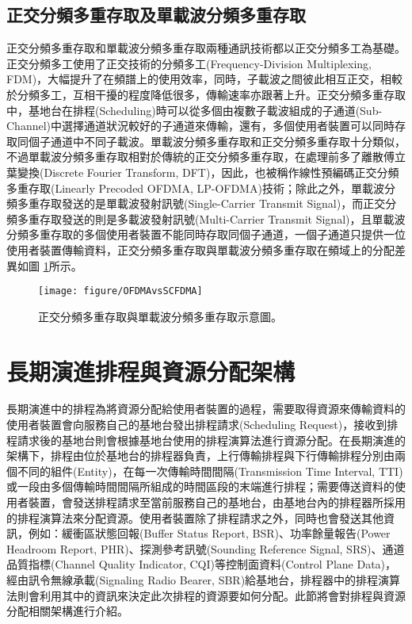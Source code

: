 \subsection{正交分頻多重存取及單載波分頻多重存取}
正交分頻多重存取和單載波分頻多重存取兩種通訊技術都以正交分頻多工為基礎。正交分頻多工使用了正交技術的分頻多工(Frequency-Division Multiplexing, FDM)，大幅提升了在頻譜上的使用效率，同時，子載波之間彼此相互正交，相較於分頻多工，互相干擾的程度降低很多，傳輸速率亦跟著上升。正交分頻多重存取中，基地台在排程(Scheduling)時可以從多個由複數子載波組成的子通道(Sub-Channel)中選擇通道狀況較好的子通道來傳輸，還有，多個使用者裝置可以同時存取同個子通道中不同子載波。單載波分頻多重存取和正交分頻多重存取十分類似，不過單載波分頻多重存取相對於傳統的正交分頻多重存取，在處理前多了離散傅立葉變換(Discrete Fourier Transform, DFT)，因此，也被稱作線性預編碼正交分頻多重存取(Linearly Precoded OFDMA, LP-OFDMA)技術\cite{damn2011}；除此之外，單載波分頻多重存取發送的是單載波發射訊號(Single-Carrier Transmit Signal)，而正交分頻多重存取發送的則是多載波發射訊號(Multi-Carrier Transmit Signal)，且單載波分頻多重存取的多個使用者裝置不能同時存取同個子通道，一個子通道只提供一位使用者裝置傳輸資料，正交分頻多重存取與單載波分頻多重存取在頻域上的分配差異如圖 \ref{fig:OFDMAvsSCFDMA}所示。
\vskip 20pt
\begin{figure}[H]
\centering
\texttt{[image: figure/OFDMAvsSCFDMA]}
\caption 
{\label{fig:OFDMAvsSCFDMA}正交分頻多重存取與單載波分頻多重存取示意圖。}
\end{figure}

\section{長期演進排程與資源分配架構}
長期演進中的排程為將資源分配給使用者裝置的過程，需要取得資源來傳輸資料的使用者裝置會向服務自己的基地台發出排程請求(Scheduling Request)，接收到排程請求後的基地台則會根據基地台使用的排程演算法進行資源分配\cite{abu2014uplink}。在長期演進的架構下，排程由位於基地台的排程器負責，上行傳輸排程與下行傳輸排程分別由兩個不同的組件(Entity)，在每一次傳輸時間間隔(Transmission Time Interval, TTI)或一段由多個傳輸時間間隔所組成的時間區段的末端進行排程；需要傳送資料的使用者裝置，會發送排程請求至當前服務自己的基地台，由基地台內的排程器所採用的排程演算法來分配資源。使用者裝置除了排程請求之外，同時也會發送其他資訊，例如：緩衝區狀態回報(Buffer Status Report, BSR)、功率餘量報告(Power Headroom Report, PHR)、探測參考訊號(Sounding Reference Signal, SRS)、通道品質指標(Channel Quality Indicator, CQI)等控制面資料(Control Plane Data)，經由訊令無線承載(Signaling Radio Bearer, SBR)給基地台，排程器中的排程演算法則會利用其中的資訊來決定此次排程的資源要如何分配。此節將會對排程與資源分配相關架構進行介紹。
